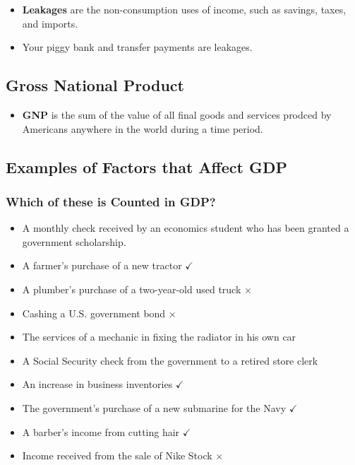 \documentclass[
  letterpaper,
  DIV=11,
  numbers=noendperiod]{scrartcl}
\providecommand{\tightlist}{%
  \setlength{\itemsep}{0pt}\setlength{\parskip}{0pt}}\usepackage{longtable,booktabs,array}
\begin{document}
\begin{itemize}
\tightlist
\item
  \textbf{Leakages} are the non-consumption uses of income, such as
  savings, taxes, and imports.
\item
  Your piggy bank and transfer payments are leakages.
\end{itemize}

\hypertarget{gross-national-product}{%
\subsection{Gross National Product}\label{gross-national-product}}

\begin{itemize}
\tightlist
\item
  \textbf{GNP} is the sum of the value of all final goods and services
  prodced by Americans anywhere in the world during a time period.
\end{itemize}

\hypertarget{examples-of-factors-that-affect-gdp}{%
\subsection{Examples of Factors that Affect
GDP}\label{examples-of-factors-that-affect-gdp}}

\hypertarget{which-of-these-is-counted-in-gdp}{%
\subsubsection{Which of these is Counted in
GDP?}\label{which-of-these-is-counted-in-gdp}}

\begin{itemize}
\tightlist
\item
  A monthly check received by an economics student who has been granted
  a government scholarship.
\item
  A farmer's purchase of a new tractor \(\checkmark\)
\item
  A plumber's purchase of a two-year-old used truck \(\times\)
\item
  Cashing a U.S. government bond \(\times\)
\item
  The services of a mechanic in fixing the radiator in his own car
\item
  A Social Security check from the government to a retired store clerk
\item
  An increase in business inventories \(\checkmark\)
\item
  The government's purchase of a new submarine for the Navy
  \(\checkmark\)
\item
  A barber's income from cutting hair \(\checkmark\)
\item
  Income received from the sale of Nike Stock \(\times\)
\end{itemize}
\end{document}
